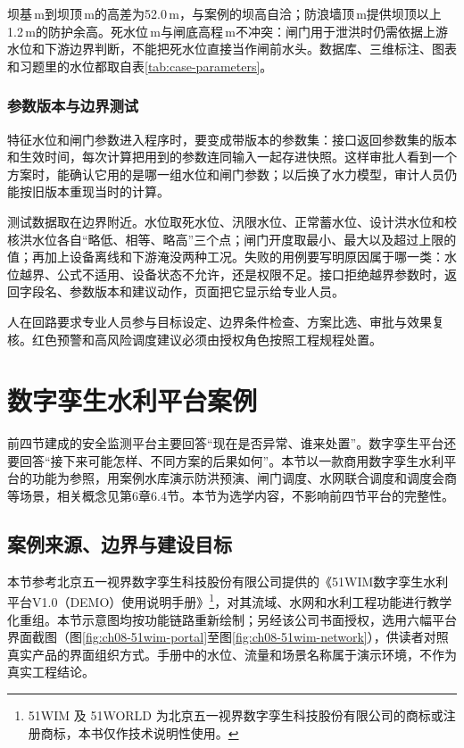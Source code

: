 坝基\cpBaseElev\,m到坝顶\cpCrestElev\,m的高差为52.0\,m，与案例的坝高自洽；防浪墙顶\cpWaveWallElev\,m提供坝顶以上1.2\,m的防护余高。死水位\cpDeadLevel\,m与闸底高程\cpGateSillElev\,m不冲突：闸门用于泄洪时仍需依据上游水位和下游边界判断，不能把死水位直接当作闸前水头。数据库、三维标注、图表和习题里的水位都取自表\ref{tab:case-parameters}。

\subsubsection{参数版本与边界测试}
特征水位和闸门参数进入程序时，要变成带版本的参数集：接口返回参数集的版本和生效时间，每次计算把用到的参数连同输入一起存进快照。这样审批人看到一个方案时，能确认它用的是哪一组水位和闸门参数；以后换了水力模型，审计人员仍能按旧版本重现当时的计算。

测试数据取在边界附近。水位取死水位、汛限水位、正常蓄水位、设计洪水位和校核洪水位各自“略低、相等、略高”三个点；闸门开度取最小、最大以及超过上限的值；再加上设备离线和下游淹没两种工况。失败的用例要写明原因属于哪一类：水位越界、公式不适用、设备状态不允许，还是权限不足。接口拒绝越界参数时，返回字段名、参数版本和建议动作，页面把它显示给专业人员。

人在回路要求专业人员参与目标设定、边界条件检查、方案比选、审批与效果复核。红色预警和高风险调度建议必须由授权角色按照工程规程处置。

\section{数字孪生水利平台案例}\label{sec:digital-twin-case}

前四节建成的安全监测平台主要回答“现在是否异常、谁来处置”。数字孪生平台还要回答“接下来可能怎样、不同方案的后果如何”。本节以一款商用数字孪生水利平台的功能为参照，用案例水库演示防洪预演、闸门调度、水网联合调度和调度会商等场景，相关概念见第6章6.4节。本节为选学内容，不影响前四节平台的完整性。

\subsection{案例来源、边界与建设目标}

本节参考北京五一视界数字孪生科技股份有限公司提供的《51WIM数字孪生水利平台V1.0（DEMO）使用说明手册》\footnote{51WIM 及 51WORLD 为北京五一视界数字孪生科技股份有限公司的商标或注册商标，本书仅作技术说明性使用。}，对其流域、水网和水利工程功能进行教学化重组\cite{wuyi2026wim}。本节示意图均按功能链路重新绘制；另经该公司书面授权，选用六幅平台界面截图（图\ref{fig:ch08-51wim-portal}至图\ref{fig:ch08-51wim-network}），供读者对照真实产品的界面组织方式。手册中的水位、流量和场景名称属于演示环境，不作为真实工程结论。

